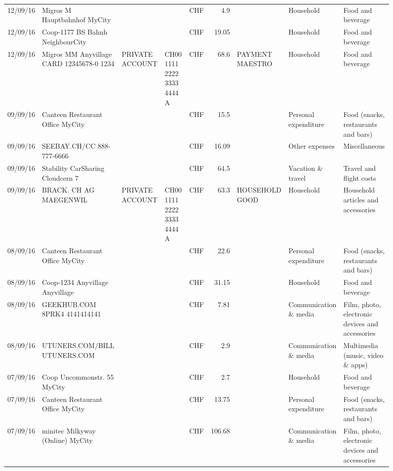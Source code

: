 \begin{landscape}
\begin{sidewaysfigure}
\begin{table}[h]
\begin{center}
\begin{tabular}{rllllrlll}
		12/09/16 & Migros M Hauptbahnhof    MyCity &       &       & CHF   & 4.9   &       & Household & Food and beverage \\
		12/09/16 & Coop-1177 BS Bahnh       NeighbourCity &       &       & CHF   & 19.05 &       & Household & Food and beverage \\
		12/09/16 & Migros MM Anyvillage CARD 12345678-0 1234 & PRIVATE ACCOUNT & CH00 1111 2222 3333 4444 A & CHF   & 68.6  & PAYMENT MAESTRO & Household & Food and beverage \\
		09/09/16 & Canteen Restaurant Office      MyCity &       &       & CHF   & 15.5  &       & Personal expenditure & Food (snacks, restaurants and bars) \\
		09/09/16 & SEEBAY.CH/CC               888-777-6666 &       &       & CHF   & 16.09 &       & Other expenses & Miscellaneous \\
		09/09/16 & Stability CarSharing      Cloudcern 7 &       &       & CHF   & 64.5  &       & Vacation \& travel & Travel and flight costs \\
		09/09/16 & BRACK. CH AG MAEGENWIL & PRIVATE ACCOUNT & CH00 1111 2222 3333 4444 A & CHF   & 63.3  & HOUSEHOLD GOOD & Household & Household articles and accessories \\
		08/09/16 & Canteen Restaurant Office      MyCity &       &       & CHF   & 22.6  &       & Personal expenditure & Food (snacks, restaurants and bars) \\
		08/09/16 & Coop-1234 Anyvillage    Anyvillage &       &       & CHF   & 31.15 &       & Household & Food and beverage \\
		08/09/16 & GEEKHUB.COM  8PRK4        4141414141 &       &       & CHF   & 7.81  &       & Communication \& media & Film, photo, electronic devices and accessories \\
		08/09/16 & UTUNERS.COM/BILL          UTUNERS.COM &       &       & CHF   & 2.9   &       & Communication \& media & Multimedia (music, video \& apps) \\
		07/09/16 & Coop Uncommonstr. 55   MyCity &       &       & CHF   & 2.7   &       & Household & Food and beverage \\
		07/09/16 & Canteen Restaurant Office      MyCity &       &       & CHF   & 13.75 &       & Personal expenditure & Food (snacks, restaurants and bars) \\
		07/09/16 & minitec Milkyway (Online) MyCity &       &       & CHF   & 106.68 &       & Communication \& media & Film, photo, electronic devices and accessories \\

\end{tabular}
\end{center}
\end{table}
\end{sidewaysfigure}
\end{landscape}
